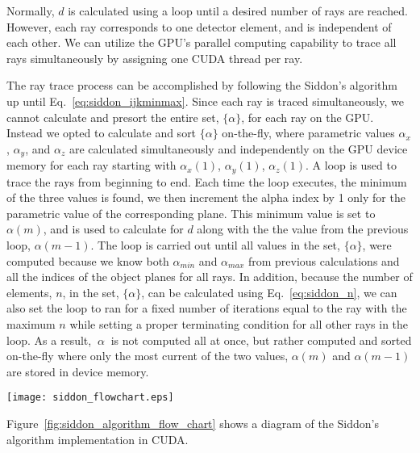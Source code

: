 Normally, $d$ is calculated using a loop until a desired number of rays are reached.  However, each ray corresponds to one detector element, and is independent of each other.  We can utilize the GPU's parallel computing capability to trace all rays simultaneously by assigning one CUDA thread per ray.

The ray trace process can be accomplished by following the Siddon's algorithm up until Eq.~\ref{eq:siddon_ijkminmax}.  Since each ray is traced simultaneously, we cannot calculate and presort the entire set, $\{ \alpha \}$, for each ray on the GPU.  Instead we opted to calculate and sort $\{ \alpha \}$ on-the-fly, where parametric values $\alpha_x$, $\alpha_y$, and $\alpha_z$ are calculated simultaneously and independently on the GPU device memory for each ray starting with $\alpha_x(1)$, $\alpha_y(1)$, $\alpha_z(1)$.  A loop is used to trace the rays from beginning to end.  Each time the loop executes, the minimum of the three values is found, we then increment the alpha index by 1 only for the parametric value of the corresponding plane.  This minimum value is set to $\alpha(m)$, and is used to calculate for $d$ along with the the value from the previous loop, $\alpha(m-1)$.  The loop is carried out until all values in the set, $\{ \alpha \}$, were computed because we know both $\alpha_{min}$ and $\alpha_{max}$ from previous calculations and all the indices of the object planes for all rays.  In addition, because the number of elements, $n$, in the set, $\{ \alpha \} $, can be calculated using Eq.~\ref{eq:siddon_n}, we can also set the loop to ran for a fixed number of iterations equal to the ray with the maximum $n$ while setting a proper terminating condition for all other rays in the loop.  As a result, $\ {\alpha\ }$ is not computed all at once, but rather computed and sorted on-the-fly where only the most current of the two values, $\alpha(m)$ and $\alpha(m-1)$ are stored in device memory.  
%
\begin{sidewaysfigure}
\texttt{[image: siddon\_flowchart.eps]}
\caption{The algorithm for Siddon's implementation on CUDA.}
\label{fig:siddon_algorithm_flow_chart}
\end{sidewaysfigure}
%
Figure~\ref{fig:siddon_algorithm_flow_chart} shows a diagram of the Siddon's algorithm implementation in CUDA.

